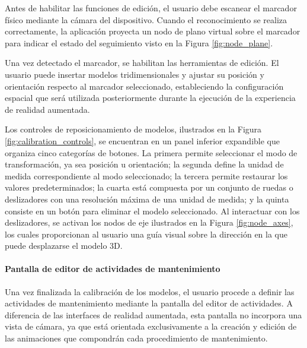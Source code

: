                 Antes de habilitar las funciones de edición, el usuario debe escanear el marcador físico mediante la cámara del dispositivo. Cuando el reconocimiento se realiza correctamente, la aplicación proyecta un nodo de plano virtual sobre el marcador para indicar el estado del seguimiento visto en la Figura \ref{fig:node_plane}.

                Una vez detectado el marcador, se habilitan las herramientas de edición. El usuario puede insertar modelos tridimensionales y ajustar su posición y orientación respecto al marcador seleccionado, estableciendo la configuración espacial que será utilizada posteriormente durante la ejecución de la experiencia de realidad aumentada.

                Los controles de reposicionamiento de modelos, ilustrados en la Figura \ref{fig:calibration_controls}, se encuentran en un panel inferior expandible que organiza cinco categorías de botones. La primera permite seleccionar el modo de transformación, ya sea posición u orientación; la segunda define la unidad de medida correspondiente al modo seleccionado; la tercera permite restaurar los valores predeterminados; la cuarta está compuesta por un conjunto de ruedas o deslizadores con una resolución máxima de una unidad de medida; y la quinta consiste en un botón para eliminar el modelo seleccionado. Al interactuar con los deslizadores, se activan los nodos de eje ilustrados en la Figura \ref{fig:node_axes}, los cuales proporcionan al usuario una guía visual sobre la dirección en la que puede desplazarse el modelo 3D.

                

            \paragraph{Pantalla de editor de actividades de mantenimiento}

                Una vez finalizada la calibración de los modelos, el usuario procede a definir las actividades de mantenimiento mediante la pantalla del editor de actividades. A diferencia de las interfaces de realidad aumentada, esta pantalla no incorpora una vista de cámara, ya que está orientada exclusivamente a la creación y edición de las animaciones que compondrán cada procedimiento de mantenimiento.

                

